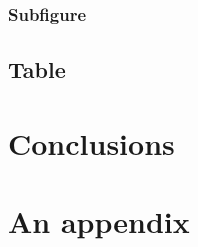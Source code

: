 \documentclass[12pt,a4paper,twoside]{report}
\begin{document}
      \FloatBarrier

      \subsubsection{Subfigure}
        \label{sec:subfig}
        

     \clearpage

    \subsection{Table}
      \label{sec:tbl}
      

  \cleardoublepage

  \section{Conclusions}
    \label{sec:outro}
    

  \nocite{*}  %
  
  

  \appendixpage
  \addappheadtotoc

  \appendix
    \section{An appendix}
    \label{sec:app}
    
\end{document}
